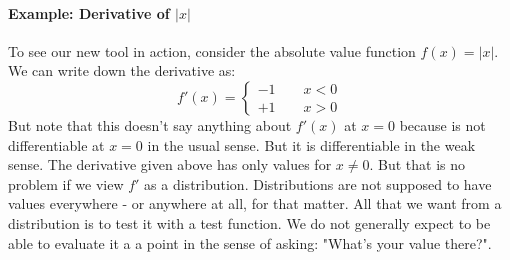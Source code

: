 



\paragraph{Example: Derivative of $|x|$}
To see our new tool in action, consider the absolute value function $f(x) = |x|$. We can write down the derivative as:
\begin{equation}
f'(x) = 
 \begin{cases}
 -1 \qquad  x < 0 \\
 +1 \qquad  x > 0
 \end{cases}
\end{equation}
But note that this doesn't say anything about $f'(x)$ at $x = 0$ because is not differentiable at $x = 0$ in the usual sense. But it is differentiable in the weak sense. The derivative given above has only values for $x \neq 0$. But that is no problem if we view $f'$ as a distribution. Distributions are not supposed to have values everywhere - or anywhere at all, for that matter. All that we want from a distribution is to test it with a test function. We do not generally expect to be able to evaluate it a a point in the sense of asking: "What's your value there?".





